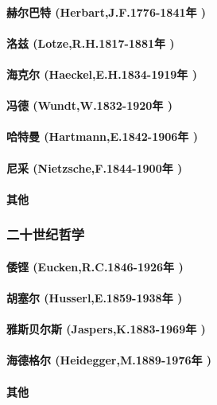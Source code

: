 \documentclass[UTF8]{../RepresentationUniverse}
\begin{document}
    \paragraph{赫尔巴特 (Herbart,J.F.1776-1841年 )}
    \paragraph{洛兹 (Lotze,R.H.1817-1881年 )}
    \paragraph{海克尔 (Haeckel,E.H.1834-1919年 )}
    \paragraph{冯德 (Wundt,W.1832-1920年 )}
    \paragraph{哈特曼 (Hartmann,E.1842-1906年 )}
    \paragraph{尼采 (Nietzsche,F.1844-1900年 )}
    \paragraph{其他}

\subsubsection{二十世纪哲学}
    \paragraph{倭铿 (Eucken,R.C.1846-1926年 )}
    \paragraph{胡塞尔 (Husserl,E.1859-1938年 )}
    \paragraph{雅斯贝尔斯 (Jaspers,K.1883-1969年 )}
    \paragraph{海德格尔 (Heidegger,M.1889-1976年 )}
    \paragraph{其他}
\end{document}
